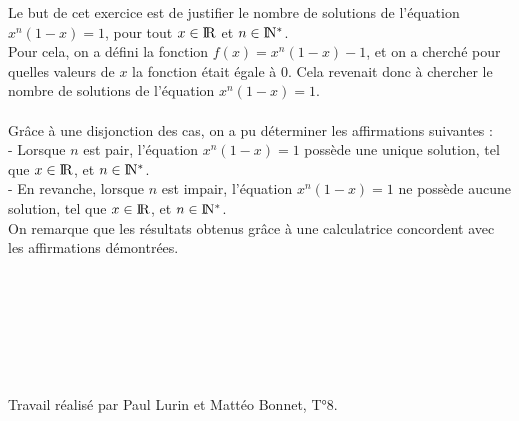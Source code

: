 \documentclass{article}
\begin{document}
\begin{exo2}
        Le but de cet exercice est de justifier le nombre de solutions de l'équation $x^{n}(1-x)=1$, pour tout $x\in{\rm I\!R}$ et $n\in{\rm I\!N^*}$. \\
        Pour cela, on a défini la fonction $f(x)=x^{n}(1-x)-1$, et on a cherché pour quelles valeurs de $x$ la fonction était égale à 0. Cela revenait donc à chercher le nombre de solutions de l'équation $x^{n}(1-x)=1$. \\ \\
        Grâce à une disjonction des cas, on a pu déterminer les affirmations suivantes : \\ 
        - Lorsque $n$ est pair, l'équation $x^{n}(1-x)=1$ possède une unique solution, tel que $x\in{\rm I\!R}$, et $n\in{\rm I\!N^*}$. \\
        - En revanche, lorsque $n$ est impair, l'équation $x^{n}(1-x)=1$ ne possède aucune solution, tel que $x\in{\rm I\!R}$, et $n\in{\rm I\!N^*}$. \\ 
        On remarque que les résultats obtenus grâce à une calculatrice concordent avec les affirmations démontrées. \\ \\ \\ \\ \\ \\ \\ \\
        
        Travail réalisé par Paul Lurin et Mattéo Bonnet, T°8.
        
         
           
    \end{exo2}



   
    

        
        
        
        
        
\end{document}
